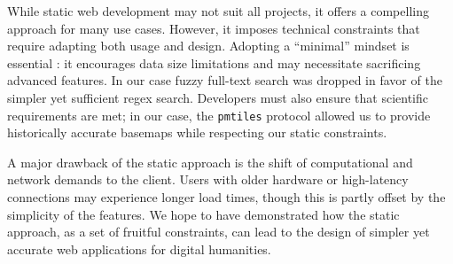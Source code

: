 \documentclass[final]{anthology-ch} %
\begin{document}
While static web development may not suit all projects, it offers a compelling approach for many use cases. However, it imposes technical constraints that require adapting both usage and design. Adopting a “minimal” mindset is essential \cite{risam_introduction_2022}: it encourages data size limitations and may necessitate sacrificing advanced features. In our case fuzzy full-text search was dropped in favor of the simpler yet sufficient regex search. Developers must also ensure that scientific requirements are met; in our case, the \texttt{pmtiles} protocol allowed us to provide historically accurate basemaps while respecting our static constraints.

A major drawback of the static approach is the shift of computational and network demands to the client. Users with older hardware or high-latency connections may experience longer load times, though this is partly offset by the simplicity of the features. We hope to have demonstrated how the static approach, as a set of fruitful constraints, can lead to the design of simpler yet accurate web applications for digital humanities.

\printbibliography
\end{document}
